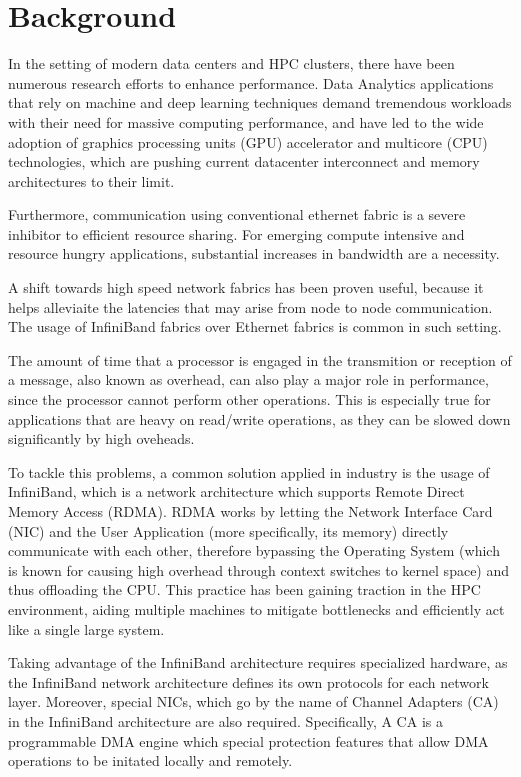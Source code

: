 \section{Background}

In the setting of modern data centers and HPC clusters, there have been numerous research efforts
to enhance performance. Data Analytics applications that rely on machine and deep learning techniques demand
tremendous workloads with their need for massive computing performance, and have led to the wide adoption of graphics
processing units (GPU) accelerator and multicore (CPU) technologies, which are pushing current datacenter interconnect
and memory architectures to their limit\cite{shalf19}.

Furthermore, communication using conventional ethernet fabric is a severe inhibitor to efficient resource sharing.
For emerging compute intensive and resource hungry applications, substantial increases in bandwidth are a necessity\cite{shalf19}.

A shift towards high speed network fabrics has been proven useful,
because it helps alleviaite the latencies that may arise from node to node communication.
The usage of InfiniBand fabrics over Ethernet fabrics is common in such setting.

The amount of time that a processor is engaged in the transmition or reception of a message, also known as overhead,
can also play a major role in performance, since the processor cannot perform other operations.
This is especially true for applications that are heavy on read/write operations, as they can
be slowed down significantly by high oveheads.\cite{martin97}

To tackle this problems, a common solution applied in industry is the usage of InfiniBand, which
is a network architecture which supports Remote Direct Memory Access (RDMA).
RDMA works by letting the Network Interface Card (NIC) and the User Application (more specifically, its memory)
directly communicate with each other, therefore bypassing the Operating System (which is known for
causing high overhead through context switches to kernel space) and thus offloading the CPU. This practice has been
gaining traction in the HPC environment, aiding multiple machines to mitigate bottlenecks and efficiently act like a
single large system.

Taking advantage of the InfiniBand architecture requires specialized hardware, as the InfiniBand network architecture defines
its own protocols for each network layer. Moreover, special NICs, which go by the name of Channel Adapters (CA) in the InfiniBand
architecture are also required. Specifically, A CA is a programmable DMA engine which special protection features that allow
DMA operations to be initated locally and remotely\cite{infinibandvol107}.



